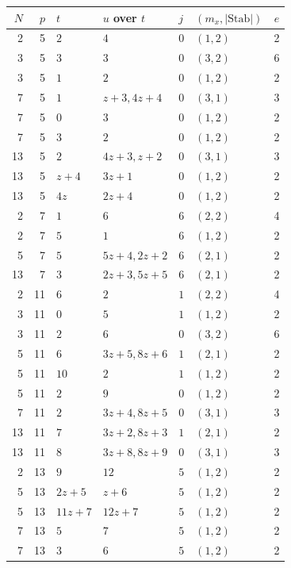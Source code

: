 \begin{longtable}{rrllllr}
\toprule
$N$ & $p$ & $t$ & $u$ over $t$ & $j$ & $(m_x,|\mathrm{Stab}|)$ & $e$\\
\midrule
\endhead
2 & 5 & $2$ & $4$ & $0$ & $(1,2)$ & 2\\
3 & 5 & $3$ & $3$ & $0$ & $(3,2)$ & 6\\
3 & 5 & $1$ & $2$ & $0$ & $(1,2)$ & 2\\
7 & 5 & $1$ & $z + 3, 4z + 4$ & $0$ & $(3,1)$ & 3\\
7 & 5 & $0$ & $3$ & $0$ & $(1,2)$ & 2\\
7 & 5 & $3$ & $2$ & $0$ & $(1,2)$ & 2\\
13 & 5 & $2$ & $4z + 3, z + 2$ & $0$ & $(3,1)$ & 3\\
13 & 5 & $z + 4$ & $3z + 1$ & $0$ & $(1,2)$ & 2\\
13 & 5 & $4z$ & $2z + 4$ & $0$ & $(1,2)$ & 2\\
2 & 7 & $1$ & $6$ & $6$ & $(2,2)$ & 4\\
2 & 7 & $5$ & $1$ & $6$ & $(1,2)$ & 2\\
5 & 7 & $5$ & $5z + 4, 2z + 2$ & $6$ & $(2,1)$ & 2\\
13 & 7 & $3$ & $2z + 3, 5z + 5$ & $6$ & $(2,1)$ & 2\\
2 & 11 & $6$ & $2$ & $1$ & $(2,2)$ & 4\\
3 & 11 & $0$ & $5$ & $1$ & $(1,2)$ & 2\\
3 & 11 & $2$ & $6$ & $0$ & $(3,2)$ & 6\\
5 & 11 & $6$ & $3z + 5, 8z + 6$ & $1$ & $(2,1)$ & 2\\
5 & 11 & $10$ & $2$ & $1$ & $(1,2)$ & 2\\
5 & 11 & $2$ & $9$ & $0$ & $(1,2)$ & 2\\
7 & 11 & $2$ & $3z + 4, 8z + 5$ & $0$ & $(3,1)$ & 3\\
13 & 11 & $7$ & $3z + 2, 8z + 3$ & $1$ & $(2,1)$ & 2\\
13 & 11 & $8$ & $3z + 8, 8z + 9$ & $0$ & $(3,1)$ & 3\\
2 & 13 & $9$ & $12$ & $5$ & $(1,2)$ & 2\\
5 & 13 & $2z + 5$ & $z + 6$ & $5$ & $(1,2)$ & 2\\
5 & 13 & $11z + 7$ & $12z + 7$ & $5$ & $(1,2)$ & 2\\
7 & 13 & $5$ & $7$ & $5$ & $(1,2)$ & 2\\
7 & 13 & $3$ & $6$ & $5$ & $(1,2)$ & 2\\
\bottomrule
\end{longtable}
